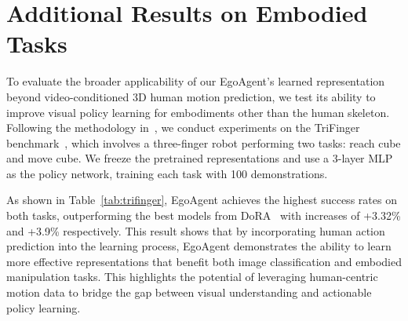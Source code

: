 \clearpage
{}
\maketitlesupplementary

\section{Additional Results on Embodied Tasks}

To evaluate the broader applicability of our EgoAgent's learned representation beyond video-conditioned 3D human motion prediction, we test its ability to improve visual policy learning for embodiments other than the human skeleton.
Following the methodology in~\cite{majumdar2023we}, we conduct experiments on the TriFinger benchmark~\cite{wuthrich2020trifinger}, which involves a three-finger robot performing two tasks: reach cube and move cube. 
We freeze the pretrained representations and use a 3-layer MLP as the policy network, training each task with 100 demonstrations.

\begin{table}[h]
\centering
\caption{Success rate (\%) on the TriFinger benchmark, where each model's pretrained representation is fixed, and additional linear layers are trained as the policy network.}
\label{tab:trifinger}
\end{table}

As shown in Table~\ref{tab:trifinger}, EgoAgent achieves the highest success rates on both tasks, outperforming the best models from DoRA~\cite{venkataramanan2023imagenet} with increases of +3.32\% and +3.9\% respectively.
This result shows that by incorporating human action prediction into the learning process, EgoAgent demonstrates the ability to learn more effective representations that benefit both image classification and embodied manipulation tasks.
This highlights the potential of leveraging human-centric motion data to bridge the gap between visual understanding and actionable policy learning.



